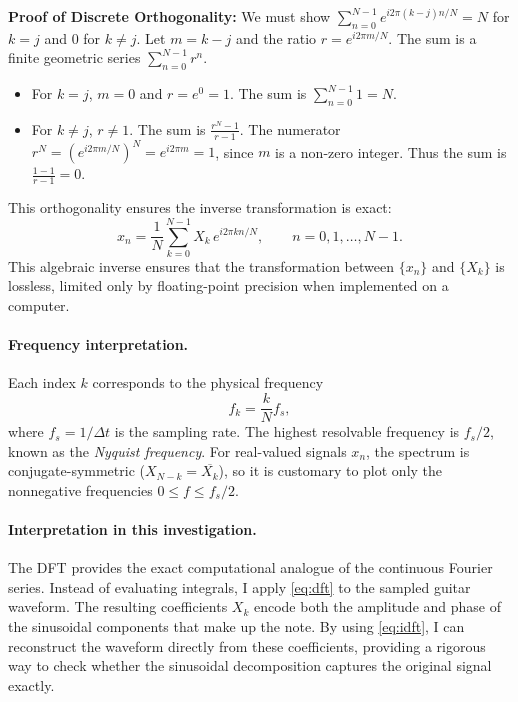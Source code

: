 \documentclass{article}
\begin{document}
\textbf{Proof of Discrete Orthogonality:} We must show $\sum_{n=0}^{N-1} e^{i2\pi(k-j)n/N} = N$ for $k=j$ and $0$ for $k \ne j$. Let $m=k-j$ and the ratio $r = e^{i2\pi m/N}$. The sum is a finite geometric series $\sum_{n=0}^{N-1} r^n$.
\begin{itemize}
    \item For $k=j$, $m=0$ and $r=e^0=1$. The sum is $\sum_{n=0}^{N-1} 1 = N$.
    \item For $k \neq j$, $r \neq 1$. The sum is $\frac{r^N-1}{r-1}$. The numerator $r^N = (e^{i2\pi m/N})^N = e^{i2\pi m} = 1$, since $m$ is a non-zero integer. Thus the sum is $\frac{1-1}{r-1} = 0$.
\end{itemize}
This orthogonality ensures the inverse transformation is exact:
\begin{equation}
    x_n = \frac{1}{N}\sum_{k=0}^{N-1} X_k\, e^{i 2\pi k n / N}, 
    \qquad n = 0,1,\dots,N-1.
    \label{eq:idft}
\end{equation}
This algebraic inverse ensures that the transformation between $\{x_n\}$ and $\{X_k\}$ is lossless, 
limited only by floating-point precision when implemented on a computer.

\paragraph{Frequency interpretation.}
Each index $k$ corresponds to the physical frequency
\begin{equation}
    f_k = \frac{k}{N} f_s,
    \label{eq:freq_map}
\end{equation}
where $f_s = 1/\Delta t$ is the sampling rate. The highest resolvable frequency is $f_s/2$, known as the 
\emph{Nyquist frequency}. For real-valued signals $x_n$, the spectrum is conjugate-symmetric 
($X_{N-k} = \overline{X_k}$), so it is customary to plot only the nonnegative frequencies 
$0 \leq f \leq f_s/2$.

\paragraph{Interpretation in this investigation.}
The DFT provides the exact computational analogue of the continuous Fourier series. 
Instead of evaluating integrals, I apply \eqref{eq:dft} to the sampled guitar waveform. 
The resulting coefficients $X_k$ encode both the amplitude and phase of the sinusoidal components 
that make up the note. By using \eqref{eq:idft}, I can reconstruct the waveform directly from these coefficients, 
providing a rigorous way to check whether the sinusoidal decomposition captures the original signal exactly.
\end{document}
